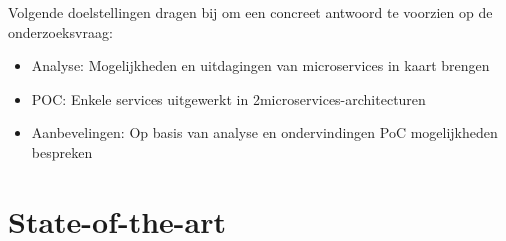 Volgende doelstellingen dragen bij om een concreet antwoord te voorzien op de onderzoeksvraag:

\begin{itemize}
    \item Analyse: Mogelijkheden en uitdagingen van microservices in kaart brengen
    \item POC: Enkele services uitgewerkt in 2\newline microservices-architecturen 
    \item Aanbevelingen: Op basis van analyse en ondervindingen PoC mogelijkheden bespreken
\end{itemize}

    
%
%
%
%
%
%


\section{State-of-the-art}%
\label{sec:state-of-the-art}
